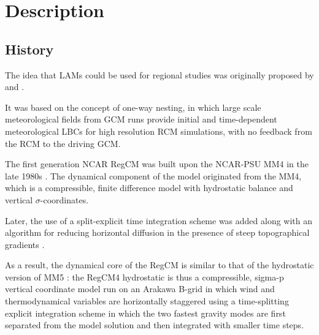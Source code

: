 
\chapter{Description}

\section{History}

The idea that \ac{LAMs} could be used for regional studies was originally
proposed by \citet{Dickinson_89} and \citet{Giorgi_90}.

It was based on the concept of one-way nesting, in which large scale
meteorological fields from \ac{GCM} runs provide initial and time-dependent
meteorological \ac{LBCs} for high resolution \ac{RCM} simulations, with no
feedback from the \ac{RCM} to the driving \ac{GCM}.

The first generation NCAR \ac{RegCM} was built upon the \ac{NCAR}-\ac{PSU}
\ac{MM4} in the late 1980s \citep{Dickinson_89, Giorgi_89}. The dynamical
component of the model originated from the \ac{MM4}, which is a compressible,
finite difference model with hydrostatic balance and vertical
$\sigma$-coordinates.

Later, the use of a split-explicit time integration scheme was added along
with an algorithm for reducing horizontal diffusion in the presence of steep
topographical gradients \citep{Giorgi_93,Giorgi_93b}.

As a result, the dynamical core of the \ac{RegCM} is similar to that of the
hydrostatic version of \ac{MM5} \citep{Grell_94}: the \ac{RegCM}4 
hydrostatic is thus a compressible, sigma-p vertical coordinate model run on an
Arakawa B-grid in which wind and thermodynamical variables are horizontally
staggered using a time-splitting explicit integration scheme in which the two
fastest gravity modes are first separated from the model solution and then
integrated with smaller time steps.

